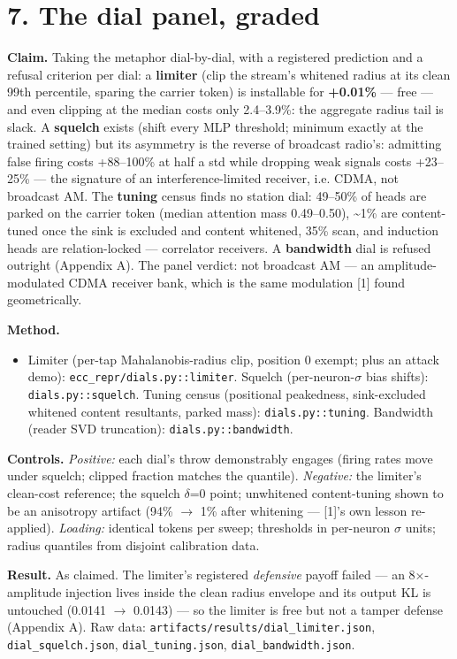 \documentclass[10pt]{article}
\begin{document}
\section{7. The dial panel, graded}

\textbf{Claim.} Taking the metaphor dial-by-dial, with a registered prediction and a refusal criterion
per dial: a \textbf{limiter} (clip the stream's whitened radius at its clean 99th percentile, sparing
the carrier token) is installable for \textbf{+0.01\%} --- free --- and even clipping at the median costs
only 2.4--3.9\%: the aggregate radius tail is slack. A \textbf{squelch} exists (shift every MLP threshold;
minimum exactly at the trained setting) but its asymmetry is the reverse of broadcast radio's:
admitting false firing costs +88--100\% at half a std while dropping weak signals costs +23--25\% ---
the signature of an interference-limited receiver, i.e. CDMA, not broadcast AM. The \textbf{tuning}
census finds no station dial: 49--50\% of heads are parked on the carrier token (median attention
mass 0.49--0.50), \textasciitilde{}1\% are content-tuned once the sink is excluded and content whitened, 35\% scan,
and induction heads are relation-locked --- correlator receivers. A \textbf{bandwidth} dial is refused
outright (Appendix A). The panel verdict: not broadcast AM --- an amplitude-modulated CDMA receiver
bank, which is the same modulation [1] found geometrically.

\textbf{Method.}
\begin{itemize}\setlength\itemsep{1pt}
\item Limiter (per-tap Mahalanobis-radius clip, position 0 exempt; plus an attack demo): \texttt{ecc\_repr/dials.py::limiter}. Squelch (per-neuron-$\sigma$ bias shifts): \texttt{dials.py::squelch}. Tuning census (positional peakedness, sink-excluded whitened content resultants, parked mass): \texttt{dials.py::tuning}. Bandwidth (reader SVD truncation): \texttt{dials.py::bandwidth}.
\end{itemize}
\textbf{Controls.} \emph{Positive:} each dial's throw demonstrably engages (firing rates move under squelch;
clipped fraction matches the quantile). \emph{Negative:} the limiter's clean-cost reference; the squelch
$\delta$=0 point; unwhitened content-tuning shown to be an anisotropy artifact (94\% $\to$ 1\% after
whitening --- [1]'s own lesson re-applied). \emph{Loading:} identical tokens per sweep; thresholds in
per-neuron $\sigma$ units; radius quantiles from disjoint calibration data.

\textbf{Result.} As claimed. The limiter's registered \emph{defensive} payoff failed --- an 8$\times$-amplitude
injection lives inside the clean radius envelope and its output KL is untouched (0.0141 $\to$ 0.0143)
--- so the limiter is free but not a tamper defense (Appendix A). Raw data:
\texttt{artifacts/results/dial\_limiter.json}, \texttt{dial\_squelch.json}, \texttt{dial\_tuning.json},
\texttt{dial\_bandwidth.json}.
\end{document}
